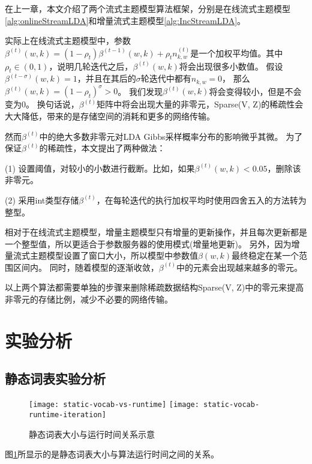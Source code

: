 在上一章，本文介绍了两个流式主题模型算法框架，分别是在线流式主题模型\ref{alg:onlineStreamLDA}和增量流式主题模型\ref{alg:IncStreamLDA}。

实际上在线流式主题模型中，参数$\beta^{(t)}(w, k) = (1 - \rho_t) \beta^{(t-1)}(w, k) + \rho_t n_{k, w}^{(t)}$是一个加权平均值。其中$\rho_t \in (0, 1)$，说明几轮迭代之后，$\beta^{(t)}(w, k)$将会出现很多小数值。
假设$\beta^{(t-\sigma)}(w, k) = 1$，并且在其后的$\sigma$轮迭代中都有$n_{k,w} = 0$，
那么$\beta^{(t)}(w, k) = (1 - \rho_t)^{\sigma} > 0 $。
我们发现$\beta^{(t)}(w, k)$将会变得较小，但是不会变为0。
换句话说，$\beta^{(t)}$矩阵中将会出现大量的非零元，Sparse(V, Z)的稀疏性会大大降低，带来的是存储空间的消耗和更多的网络传输。

然而$\beta^{(t)}$中的绝大多数非零元对LDA Gibbs采样概率分布的影响微乎其微。
为了保证$\beta^{(t)}$的稀疏性，本文提出了两种做法：

(1) 设置阈值，对较小的小数进行截断。比如，如果$\beta^{(t)}(w, k) < 0.05$，删除该非零元。

(2) 采用int类型存储$\beta^{(t)}$，在每轮迭代的执行加权平均时使用四舍五入的方法转为整型。

相对于在线流式主题模型，增量主题模型只有增量的更新操作，并且每次更新都是一个整型值，所以更适合于参数服务器的使用模式(增量地更新)。
另外，因为增量流式主题模型设置了窗口大小，所以模型中参数值$\beta(w, k)$最终稳定在某一个范围区间内。
同时，随着模型的逐渐收敛，$\beta^{(t)}$中的元素会出现越来越多的零元。

以上两个算法都需要单独的步骤来删除稀疏数据结构Sparse(V, Z)中的零元来提高非零元的存储比例，减少不必要的网络传输。


\section{实验分析}

\subsection{静态词表实验分析}
\begin{figure}[htb]\centering
\texttt{[image: static-vocab-vs-runtime]}
\texttt{[image: static-vocab-runtime-iteration]}
\caption{静态词表大小与运行时间关系示意}
\label{fig:static-vocab-runtime}       %
\end{figure}

图\ref{fig:static-vocab-runtime}所显示的是静态词表大小与算法运行时间之间的关系。

